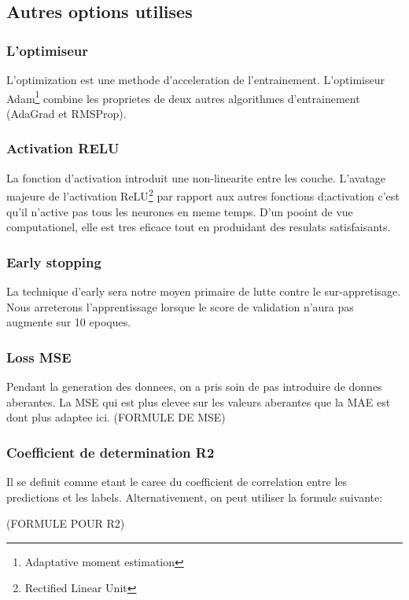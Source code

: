 \subsection{Autres options utilises}

\subsubsection{L'optimiseur}
L'optimization est une methode d'acceleration de l'entrainement. L'optimiseur Adam\footnote{Adaptative moment estimation} combine les proprietes de deux autres algorithmes d'entrainement (AdaGrad et RMSProp).

\subsubsection{Activation RELU}
La fonction d'activation introduit une non-linearite entre les couche. L'avatage majeure de l'activation ReLU\footnote{Rectified Linear Unit} par rapport aux autres fonctions d;activation c'est qu'il n'active pas tous les neurones en meme temps. D'un pooint de vue computationel, elle est tres eficace tout en produidant des resulats satisfaisants.

\subsubsection{Early stopping}

La technique d'early sera notre moyen primaire de lutte contre le sur-appretisage. Nous arreterons l'apprentissage lorsque le score de validation n'aura pas augmente sur 10 epoques.

\subsubsection{Loss MSE}
Pendant la generation des donnees, on a pris soin de pas introduire de donnes aberantes. La MSE qui est plus elevee sur les valeurs aberantes que la MAE est dont plus adaptee ici.
(FORMULE DE MSE)

\subsubsection{Coefficient de determination R2}
Il se definit comme etant le caree du coefficient de correlation entre les predictions et les labels. Alternativement, on peut utiliser la formule suivante:

(FORMULE POUR R2)

